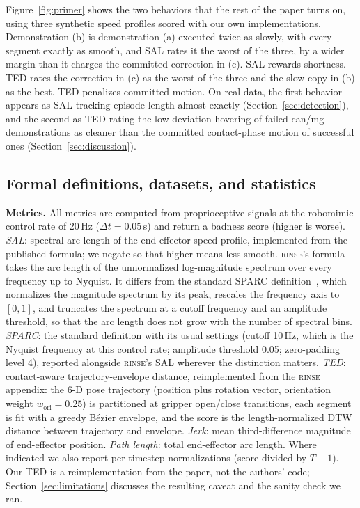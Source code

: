 \documentclass[10pt]{article}
\newcommand{\rinse}{\textmd{\textsc{rinse}}}
\begin{document}
Figure~\ref{fig:primer} shows the two behaviors that the rest of the paper
turns on, using three synthetic speed profiles scored with our own
implementations. Demonstration (b) is demonstration (a) executed twice as
slowly, with every segment exactly as smooth, and SAL rates it the worst of
the three, by a wider margin than it charges the committed correction in
(c). SAL rewards shortness. TED rates the correction in (c) as the worst of
the three and the slow copy in (b) as the best. TED penalizes committed
motion. On real data, the first behavior appears as SAL tracking episode
length almost exactly (Section~\ref{sec:detection}), and the second as TED
rating the low-deviation hovering of failed can/mg demonstrations as
cleaner than the committed contact-phase motion of successful ones
(Section~\ref{sec:discussion}).

\subsection{Formal definitions, datasets, and statistics}
\label{sec:formal}

\textbf{Metrics.} All metrics are computed from proprioceptive signals at the
robomimic control rate of 20\,Hz ($\Delta t = 0.05$\,s) and return a badness
score (higher is worse). \emph{SAL}: spectral arc length of the end-effector
speed profile, implemented from the published formula; we negate so that
higher means less smooth. \rinse{}'s formula takes the arc length of the
unnormalized log-magnitude spectrum over every frequency up to Nyquist. It
differs from the standard SPARC definition~\citep{sparc}, which normalizes
the magnitude spectrum by its peak, rescales the frequency axis to $[0,1]$,
and truncates the spectrum at a cutoff frequency and an amplitude threshold,
so that the arc length does not grow with the number of spectral bins.
\emph{SPARC}: the standard definition with its usual settings (cutoff
10\,Hz, which is the Nyquist frequency at this control rate; amplitude
threshold 0.05; zero-padding level 4), reported alongside \rinse{}'s SAL
wherever the distinction matters. \emph{TED}: contact-aware trajectory-envelope
distance, reimplemented from the \rinse{} appendix: the 6-D pose trajectory
(position plus rotation vector, orientation weight $w_{\mathrm{ori}} =
0.25$) is partitioned at gripper open/close transitions, each segment is fit
with a greedy B\'ezier envelope, and the score is the length-normalized DTW
distance between trajectory and envelope. \emph{Jerk}: mean third-difference
magnitude of end-effector position. \emph{Path length}: total end-effector
arc length. Where indicated we also report per-timestep normalizations
(score divided by $T{-}1$). Our TED is a reimplementation from the paper, not
the authors' code; Section~\ref{sec:limitations} discusses the resulting
caveat and the sanity check we ran.
\end{document}
